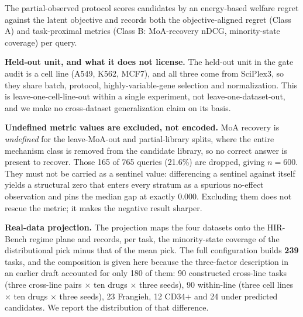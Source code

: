 \documentclass[11pt,letterpaper]{article}
\begin{document}
The partial-observed protocol scores candidates by an energy-based welfare regret against
the latent objective and records both the objective-aligned regret (Class A) and
task-proximal metrics (Class B: MoA-recovery nDCG\cite{nDCG}, minority-state coverage) per query.

\textbf{Held-out unit, and what it does not license.} The held-out unit in the gate audit
is a cell line (A549, K562, MCF7), and all three come from SciPlex3, so they share
batch, protocol, highly-variable-gene selection and normalization. This is
leave-one-cell-line-out within a single experiment, not leave-one-dataset-out, and we make
no cross-dataset generalization claim on its basis.

\textbf{Undefined metric values are excluded, not encoded.} MoA recovery is \emph{undefined}
for the leave-MoA-out and partial-library splits, where the entire mechanism class is removed
from the candidate library, so no correct answer is present to recover. Those 165 of 765
queries (21.6\%) are dropped, giving $n = 600$. They must not be carried as a sentinel value:
differencing a sentinel against itself yields a structural zero that enters every stratum as
a spurious no-effect observation and pins the median gap at exactly 0.000. Excluding them
does not rescue the metric; it makes the negative result sharper.

\textbf{Real-data projection.} The projection maps the four datasets onto the HIR-Bench
regime plane and records, per task, the minority-state coverage of the distributional pick minus that
of the mean pick. The full configuration builds \textbf{239} tasks, and the composition is given here because the three-factor description in an earlier draft accounted for only 180 of them: 90 constructed cross-line tasks (three cross-line pairs $\times$ ten drugs $\times$ three seeds), 90 within-line (three cell lines $\times$ ten drugs $\times$ three seeds), 23 Frangieh, 12 CD34$+$ and 24 under predicted candidates. We report the distribution of that difference.
\end{document}
